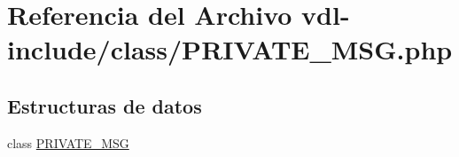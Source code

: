 \hypertarget{PRIVATE__MSG_8php}{\section{Referencia del Archivo vdl-\/include/class/\-P\-R\-I\-V\-A\-T\-E\-\_\-\-M\-S\-G.php}
\label{PRIVATE__MSG_8php}
}
\subsection*{Estructuras de datos}
\begin{DoxyCompactItemize}
\item 
class \hyperlink{classPRIVATE__MSG}{P\-R\-I\-V\-A\-T\-E\-\_\-\-M\-S\-G}
\end{DoxyCompactItemize}
